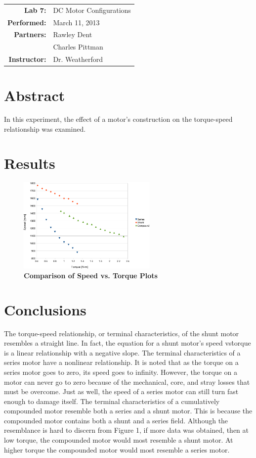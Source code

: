 \documentclass{article}
\begin{document}
\begin{tabular}{rl}
  \textbf{Lab 7:} & DC Motor Configurations \\
  \textbf{Performed:} & March 11, 2013 \\
  \textbf{Partners:} & Rawley Dent \\ & Charles Pittman \\
  \textbf{Instructor:} & Dr. Weatherford
\end{tabular}


\section*{Abstract}

In this experiment, the effect of a motor's construction on the torque-speed
relationship was examined.

\section*{Results}

\begin{figure}[H]
  \centering
    \includegraphics[width=0.6\textwidth]{img/graph}
    \caption{\textbf{Comparison of Speed vs. Torque Plots}}
    \label{fig:graph}
\end{figure}

\section*{Conclusions}

The torque-speed relationship, or terminal characteristics, of the shunt motor
resembles a straight line. In fact, the equation for a shunt motor’s speed vs\.
torque is a linear relationship with a negative slope. The terminal
characteristics of a series motor have a nonlinear relationship. It is noted
that as the torque on a series motor goes to zero, its speed goes to infinity.
However, the torque on a motor can never go to zero because of the mechanical,
core, and stray losses that must be overcome. Just as well, the speed of a
series motor can still turn fast enough to damage itself. The terminal
characteristics of a cumulatively compounded motor resemble both a series and a
shunt motor. This is because the compounded motor contains both a shunt and a
series field. Although the resemblance is hard to discern from Figure 1, if
more data was obtained, then at low torque, the compounded motor would most
resemble a shunt motor.  At higher torque the compounded motor would most
resemble a series motor.
\end{document}
